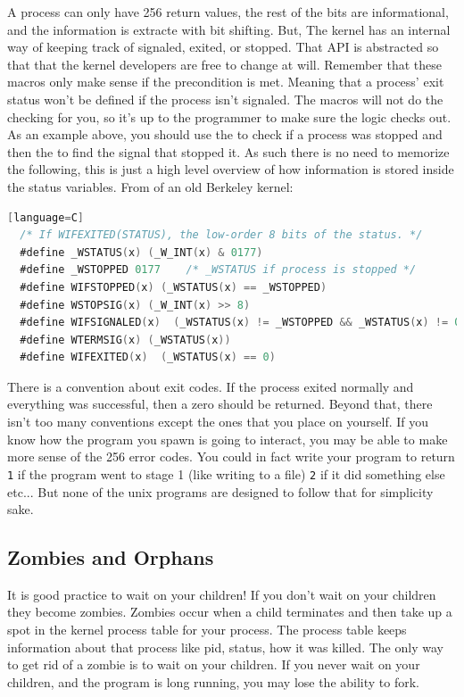 \begin{itemize}
A process can only have 256 return values, the rest of the bits are informational, and the information is extracte with bit shifting.
But, The kernel has an internal way of keeping track of signaled, exited, or stopped.
That API is abstracted so that that the kernel developers are free to change at will.
Remember that these macros only make sense if the precondition is met.
Meaning that a process' exit status won't be defined if the process isn't signaled.
The macros will not do the checking for you, so it's up to the programmer to make sure the logic checks out.
As an example above, you should use the  to check if a process was stopped and then the  to find the signal that stopped it.
As such there is no need to memorize the following, this is just a high level overview of how information is stored inside the status variables. From  of an old Berkeley kernel\cite{sys/wait.h}:

\begin{lstlisting}[language=C][language=C]
  /* If WIFEXITED(STATUS), the low-order 8 bits of the status. */
  #define _WSTATUS(x) (_W_INT(x) & 0177)
  #define _WSTOPPED 0177    /* _WSTATUS if process is stopped */
  #define WIFSTOPPED(x) (_WSTATUS(x) == _WSTOPPED)
  #define WSTOPSIG(x) (_W_INT(x) >> 8)
  #define WIFSIGNALED(x)  (_WSTATUS(x) != _WSTOPPED && _WSTATUS(x) != 0)
  #define WTERMSIG(x) (_WSTATUS(x))
  #define WIFEXITED(x)  (_WSTATUS(x) == 0)
\end{lstlisting}

There is a convention about exit codes.
If the process exited normally and everything was successful, then a zero should be returned.
Beyond that, there isn't too many conventions except the ones that you place on yourself.
If you know how the program you spawn is going to interact, you may be able to make more sense of the 256 error codes.
You could in fact write your program to return \texttt{1} if the program went to stage 1 (like writing to a file) \texttt{2} if it did something else etc... But none of the unix programs are designed to follow that for simplicity sake.


\subsection{Zombies and Orphans}

It is good practice to wait on your children!
If you don't wait on your children they become zombies.
Zombies occur when a child terminates and then take up a spot in the kernel process table for your process.
The process table keeps information about that process like pid, status, how it was killed.
The only way to get rid of a zombie is to wait on your children.
If you never wait on your children, and the program is long running, you may lose the ability to fork.


\end{itemize}
